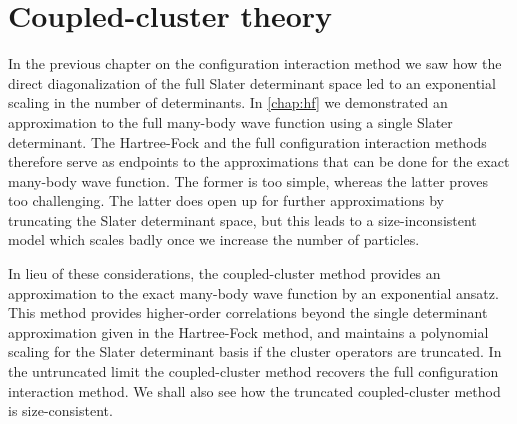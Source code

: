 \chapter{Coupled-cluster theory}
    \label{chap:cc}
    In the previous chapter on the configuration interaction method we saw how
    the direct diagonalization of the full Slater determinant space led to an
    exponential scaling in the number of determinants.
    In \autoref{chap:hf} we demonstrated an approximation to the full many-body
    wave function using a single Slater determinant.
    The Hartree-Fock and the full configuration interaction methods therefore
    serve as endpoints to the approximations that can be done for the exact
    many-body wave function.
    The former is too simple, whereas the latter proves too challenging.
    The latter does open up for further approximations by truncating the Slater
    determinant space, but this leads to a size-inconsistent model which scales
    badly once we increase the number of particles.

    In lieu of these considerations, the coupled-cluster method provides an
    approximation to the exact many-body wave function by an exponential ansatz.
    This method provides higher-order correlations beyond the single determinant
    approximation given in the Hartree-Fock method, and maintains a polynomial
    scaling for the Slater determinant basis if the cluster operators are
    truncated.
    In the untruncated limit the coupled-cluster method recovers the full
    configuration interaction method.
    We shall also see how the truncated coupled-cluster method is
    size-consistent.


